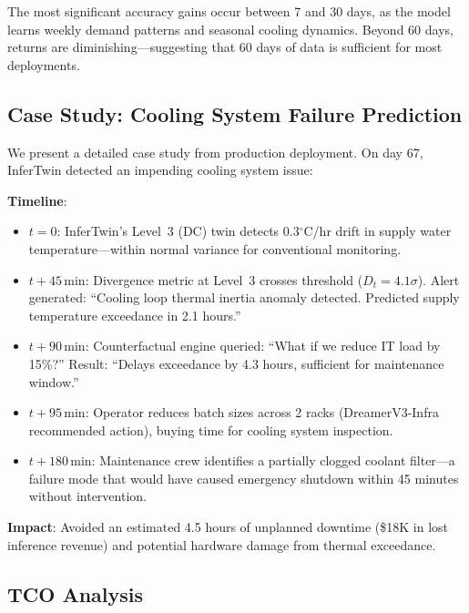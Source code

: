 \documentclass[conference,10pt]{IEEEtran}
\begin{document}
The most significant accuracy gains occur between 7 and 30 days, as the model learns weekly demand patterns and seasonal cooling dynamics. Beyond 60 days, returns are diminishing---suggesting that 60 days of data is sufficient for most deployments.

\subsection{Case Study: Cooling System Failure Prediction}

We present a detailed case study from production deployment. On day 67, InferTwin detected an impending cooling system issue:

\textbf{Timeline}:
\begin{itemize}
\item $t{=}0$: InferTwin's Level~3 (DC) twin detects 0.3$^\circ$C/hr drift in supply water temperature---within normal variance for conventional monitoring.
\item $t{+}45$\,min: Divergence metric at Level~3 crosses threshold ($D_t = 4.1\sigma$). Alert generated: ``Cooling loop thermal inertia anomaly detected. Predicted supply temperature exceedance in 2.1 hours.''
\item $t{+}90$\,min: Counterfactual engine queried: ``What if we reduce IT load by 15\%?'' Result: ``Delays exceedance by 4.3 hours, sufficient for maintenance window.''
\item $t{+}95$\,min: Operator reduces batch sizes across 2 racks (DreamerV3-Infra recommended action), buying time for cooling system inspection.
\item $t{+}180$\,min: Maintenance crew identifies a partially clogged coolant filter---a failure mode that would have caused emergency shutdown within 45 minutes without intervention.
\end{itemize}

\textbf{Impact}: Avoided an estimated 4.5 hours of unplanned downtime (\$18K in lost inference revenue) and potential hardware damage from thermal exceedance.

\subsection{TCO Analysis}
\end{document}
